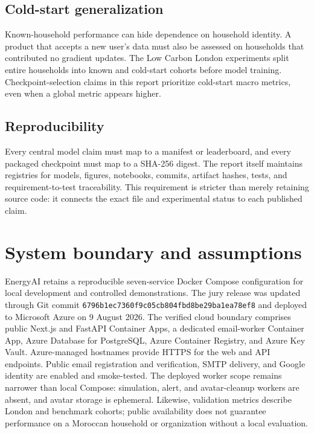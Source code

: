 \subsection{Cold-start generalization}

Known-household performance can hide dependence on household identity. A product that accepts a new user's data must also be assessed on households that contributed no gradient updates. The Low Carbon London experiments split entire households into known and cold-start cohorts before model training. Checkpoint-selection claims in this report prioritize cold-start macro metrics, even when a global metric appears higher.

\subsection{Reproducibility}

Every central model claim must map to a manifest or leaderboard, and every packaged checkpoint must map to a SHA-256 digest. The report itself maintains registries for models, figures, notebooks, commits, artifact hashes, tests, and requirement-to-test traceability. This requirement is stricter than merely retaining source code: it connects the exact file and experimental status to each published claim.

\section{System boundary and assumptions}

EnergyAI retains a reproducible seven-service Docker Compose configuration for local development and controlled demonstrations. The jury release was updated through Git commit \texttt{6796b1ec7360f9c05cb804fbd8be29ba1ea78ef8} and deployed to Microsoft Azure on 9 August 2026. The verified cloud boundary comprises public Next.js and FastAPI Container Apps, a dedicated email-worker Container App, Azure Database for PostgreSQL, Azure Container Registry, and Azure Key Vault. Azure-managed hostnames provide HTTPS for the web and API endpoints. Public email registration and verification, SMTP delivery, and Google identity are enabled and smoke-tested. The deployed worker scope remains narrower than local Compose: simulation, alert, and avatar-cleanup workers are absent, and avatar storage is ephemeral. Likewise, validation metrics describe London and benchmark cohorts; public availability does not guarantee performance on a Moroccan household or organization without a local evaluation.

